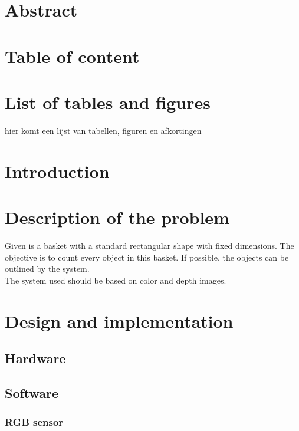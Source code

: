 \documentclass{article}
\begin{document}


\section{Abstract}

\section{Table of content}

\section{List of tables and figures}
hier komt een lijst van tabellen, figuren en afkortingen

\section{Introduction}

\section{Description of the problem}

\hspace{\parindent} Given is a basket with a standard rectangular shape with fixed dimensions. The objective is to count every object in this basket. If possible, the objects can be outlined by the system.\\

\noindent The system used should be based on color and depth images.


\section{Design and implementation}
\subsection{Hardware}
\subsection{Software}
\subsubsection{RGB sensor}
\end{document}
